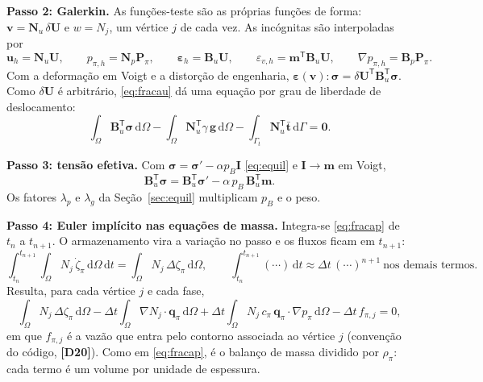 \documentclass[11pt,a4paper]{article}
\numberwithin{equation}{section}
\newcommand{\dd}{\mathrm{d}}
\newcommand{\Id}{\mathbf I}
\newcommand{\eps}{\boldsymbol\varepsilon}
\newcommand{\sig}{\boldsymbol\sigma}
\newcommand{\disc}[1]{\textcolor{red!70!black}{\textbf{\footnotesize[#1]}}}
\begin{document}
\textbf{Passo 2: Galerkin.} As funções-teste são as próprias funções de forma: $\mathbf v=\mathbf N_u\,\delta\mathbf U$ e
$w=N_j$, um vértice $j$ de cada vez. As incógnitas são interpoladas por
\begin{equation}
\mathbf u_h=\mathbf N_u\mathbf U,\qquad p_{\pi,h}=\mathbf N_p\mathbf P_\pi,\qquad
\eps_h=\mathbf B_u\mathbf U,\qquad \varepsilon_{v,h}=\mathbf m^{\mathsf T}\mathbf B_u\mathbf U,\qquad
\nabla p_{\pi,h}=\mathbf B_p\mathbf P_\pi .
\label{eq:galerkin}
\end{equation}
Com a deformação em Voigt e a distorção de engenharia, $\eps(\mathbf v):\sig=\delta\mathbf U^{\mathsf T}\mathbf B_u^{\mathsf T}\sig$.
Como $\delta\mathbf U$ é arbitrário, \eqref{eq:fracau} dá uma equação por grau de liberdade de deslocamento:
\begin{equation}
\int_\Omega\mathbf B_u^{\mathsf T}\sig\,\dd\Omega-\int_\Omega\mathbf N_u^{\mathsf T}\gamma\,\mathbf g\,\dd\Omega
-\int_{\Gamma_t}\mathbf N_u^{\mathsf T}\bar{\mathbf t}\,\dd\Gamma=\mathbf 0 .
\label{eq:galu}
\end{equation}

\textbf{Passo 3: tensão efetiva.} Com $\sig=\sig'-\alpha p_B\Id$ \eqref{eq:equil} e $\Id\to\mathbf m$ em Voigt,
\begin{equation}
\mathbf B_u^{\mathsf T}\sig=\mathbf B_u^{\mathsf T}\sig'-\alpha\,p_B\,\mathbf B_u^{\mathsf T}\mathbf m .
\label{eq:Bsig}
\end{equation}
Os fatores $\lambda_p$ e $\lambda_g$ da Seção~\ref{sec:equil} multiplicam $p_B$ e o peso.

\textbf{Passo 4: Euler implícito nas equações de massa.} Integra-se \eqref{eq:fracap} de $t_n$ a $t_{n+1}$. O
armazenamento vira a variação no passo e os fluxos ficam em $t_{n+1}$:
\begin{equation}
\int_{t_n}^{t_{n+1}}\!\!\int_\Omega N_j\,\dot\zeta_\pi\,\dd\Omega\,\dd t=\int_\Omega N_j\,\Delta\zeta_\pi\,\dd\Omega,\qquad
\int_{t_n}^{t_{n+1}}(\cdots)\,\dd t\approx\Delta t\,(\cdots)^{n+1}\ \text{nos demais termos}.
\label{eq:euler}
\end{equation}
Resulta, para cada vértice $j$ e cada fase,
\begin{equation}
\int_\Omega N_j\,\Delta\zeta_\pi\,\dd\Omega-\Delta t\int_\Omega\nabla N_j\cdot\mathbf q_\pi\,\dd\Omega
+\Delta t\int_\Omega N_j\,c_\pi\,\mathbf q_\pi\cdot\nabla p_\pi\,\dd\Omega-\Delta t\,f_{\pi,j}=0,
\label{eq:galp}
\end{equation}
em que $f_{\pi,j}$ é a vazão que entra pelo contorno associada ao vértice $j$ (convenção do código, \disc{D20}). Como em
\eqref{eq:fracap}, é o balanço de massa dividido por $\rho_\pi$: cada termo é um volume por unidade de espessura.
\end{document}
